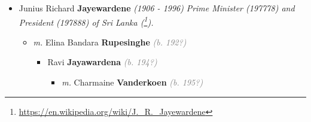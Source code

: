 \documentclass[10pt, openany]{book}
\begin{document}
\begin{itemize}
{\begin{itemize}
{\begin{itemize}
{\begin{itemize}
{\begin{itemize}
\item{\textit{m.} Prasanna \textbf{Kannangara} \textcolor{gray}{\textit{(b. 195?)}} \textcolor{slmaroon}{\textit{Banker.}} Son of  Don Donald \textbf{Kannangara} \textcolor{slorange}{\textit{(b. 1920)}} \textcolor{slmaroon}{\textit{Started his career at Bank of Ceylon was later a Founder Director of Sampath Bank, General Manager of People' s Bank and of the Development Finance Corporation of Ceylon (DFCC) (\footnote{\url{http://www.natlib.lk/pdf/50th_Anniversary.pdf}}).}} \textcolor{slteal}{\textit{See  \autoref{00000402} \textit{, p. \pageref{00000402} }}}  \&  Imogen Sita \textbf{Kumarasinghe} \textcolor{gray}{\textit{(b. 192?)}} \textcolor{slmaroon}{\textit{The first woman director of the Department Census and Statistics (\footnote{\url{http://www.ladiescollege.lk/index.php/16-2/alumni/}}).}} \textcolor{slteal}{\textit{See  \autoref{00000499} \textit{, p. \pageref{00000499} }}}   \label{couple:00000359:00000451} \begin{itemize}
\item{Jitvan Bodhikumara Wijesinghe \textbf{Kannangara} \textcolor{slorange}{\textit{(b. 1982)}} \textcolor{slmaroon}{\textit{Pilot.}}
   }
\item{Amodha \textbf{Kannangara} \textcolor{gray}{\textit{(b. 198?)}}
 }
\end{itemize}}
\end{itemize}
 }
\end{itemize}}
\end{itemize}
  }
\item{Junius Richard \textbf{Jayewardene} \textcolor{slorange}{\textit{(1906 - 1996)}} \textcolor{slmaroon}{\textit{Prime Minister (197778) and President (197888) of Sri Lanka (\footnote{\url{https://en.wikipedia.org/wiki/J._R._Jayewardene}}).}}
\begin{itemize}
\item{\textit{m.} Elina Bandara \textbf{Rupesinghe} \textcolor{gray}{\textit{(b. 192?)}}   \label{couple:00002586:00003454} \begin{itemize}
\item{Ravi  \textbf{Jayawardena} \textcolor{gray}{\textit{(b. 194?)}}
\begin{itemize}
\item{\textit{m.} Charmaine \textbf{Vanderkoen} \textcolor{gray}{\textit{(b. 195?)}}   \label{couple:00003455:00003456} \begin{itemize}

\end{itemize}}
\end{itemize}}
\end{itemize}}
\end{itemize}}
\end{itemize}}
\end{itemize}
\end{document}
